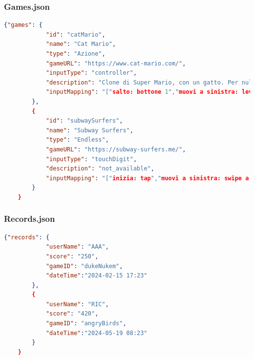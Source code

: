 \subsubsection{Games.json}
\begin{lstlisting}[language=json,firstnumber=1]
    {"games": {
            "id": "catMario",
            "name": "Cat Mario",
            "type": "Azione",
            "gameURL": "https://www.cat-mario.com/",
            "inputType": "controller",
            "description": "Clone di Super Mario, con un gatto. Per nulla stressante!",
            "inputMapping": "["salto: bottone 1","muovi a sinistra: leva D-Pad sinistra","muovi a destra: leva D-Pad destra"]"
        },
        {
            "id": "subwaySurfers",
            "name": "Subway Surfers",
            "type": "Endless",
            "gameURL": "https://subway-surfers.me/",
            "inputType": "touchDigit",
            "description": "not_available",
            "inputMapping": "["inizia: tap","muovi a sinistra: swipe a sinistra","muovi a destra: swipe a destra","salto: swipe in alto","rotolata:swipe in basso"]"
        }
    }
\end{lstlisting}
\subsubsection{Records.json}
\begin{lstlisting}[language=json,firstnumber=1]
    {"records": {
            "userName": "AAA",
            "score": "250",
            "gameID": "dukeNukem",
            "dateTime":"2024-02-15 17:23"
        },
        {
            "userName": "RIC",
            "score": "420",
            "gameID": "angryBirds",
            "dateTime":"2024-05-19 08:23"
        }
    }
\end{lstlisting}